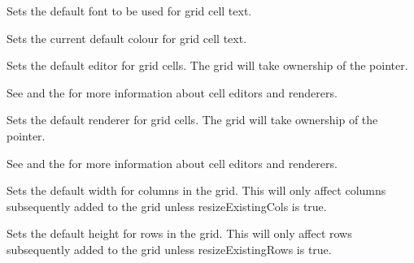 Sets the default font to be used for grid cell text.



\label{wxgridsetdefaultcelltextcolour}


Sets the current default colour for grid cell text.



\label{wxgridsetdefaulteditor}


Sets the default editor for grid cells. The grid will take ownership of the pointer.

See  and
the  for more information about cell editors and renderers.



\label{wxgridsetdefaultrenderer}


Sets the default renderer for grid cells. The grid will take ownership of the pointer.

See  and
the  for more information about cell editors and renderers.



\label{wxgridsetdefaultcolsize}


Sets the default width for columns in the grid. This will only affect columns subsequently added to
the grid unless resizeExistingCols is true.



\label{wxgridsetdefaultrowsize}


Sets the default height for rows in the grid. This will only affect rows subsequently added
to the grid unless resizeExistingRows is true.



